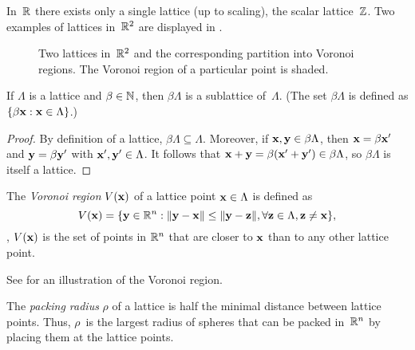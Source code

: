\begin{example}
  \label{ex:scalarlattice}
  In~$\mathbb{R}$ there exists only a single lattice (up to scaling), the scalar
  lattice~$\mathbb{Z}$. Two examples of lattices in~$\mathbb{R}^2$ are displayed in
  .
\end{example}
\begin{figure}[tbp]
  \centerline{%
  \hfil
  }
  \caption{Two lattices in~$\mathbb{R}^2$ and the corresponding partition into Voronoi
  regions. The Voronoi region of a particular point is shaded.}
  \label{fig:r2lattices}
\end{figure}
\begin{proposition}
  \label{prop:intsublattice}
  If $\Lambda$ is a lattice and $\beta \in {\mathbb{N}}$, then $\beta \Lambda$ is a
  sublattice of~$\Lambda$. (The set $\beta \Lambda$ is defined as $\{ \beta \mathbf{x} :
  \mathbf{x} \in \Lambda\}$.)
\end{proposition}

\begin{proof}
  By definition of a lattice, $\beta \Lambda \subseteq \Lambda$. Moreover, if
  $\mathbf{x}, \mathbf{y} \in \beta \Lambda$, then $\mathbf{x} = \beta \mathbf{x}'$ and $\mathbf{y} = \beta \mathbf{y}'$ with
  $\mathbf{x}', \mathbf{y}' \in \Lambda$. It follows that $\mathbf{x} + \mathbf{y} = \beta (\mathbf{x}' + \mathbf{y}') \in \beta
  \Lambda$, so $\beta\Lambda$ is itself a lattice.
\end{proof}

\begin{definition}
  The \emph{Voronoi region} $V(\mathbf{x})$ of a lattice point $\mathbf{x} \in \Lambda$ is
  defined as
  \begin{equation*}
    V(\mathbf{x}) = \{\mathbf{y} \in \mathbb{R}^n : \|\mathbf{y} - \mathbf{x}\| \le \|\mathbf{y} - \mathbf{z}\|, \forall \mathbf{z} \in \Lambda,
    \mathbf{z} \ne \mathbf{x} \},
  \end{equation*}
  \ie, $V(\mathbf{x})$ is the set of points in $\mathbb{R}^n$ that are closer to $\mathbf{x}$ than to
  any other lattice point.
\end{definition}
See  for an illustration of the Voronoi region.

\begin{definition}
  The \emph{packing radius} $\rho$ of a lattice is half the minimal distance
  between lattice points. Thus, $\rho$~is the largest radius of spheres that can
  be packed in~$\mathbb{R}^n$ by placing them at the lattice points.
\end{definition}

